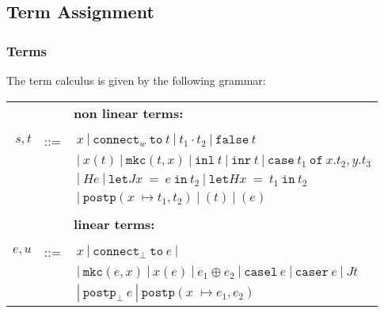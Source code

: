 \subsection{Term Assignment}
\label{sec:term_assignment}

\subsubsection{Terms}

The term calculus is given by the following grammar: 
\begin{center}

\begin{tabular}{rcl}
&&{\bf non linear terms:}\\
\\
$s, t$ & \quad ::=\quad &$\ x\ |\  \mathtt{connect}_w\ \mathtt{to}\  t\ |\  t_1\cdot t_2\ |\  \mathtt{false}\  t\ $\\
&& $\ |\ x(t)\ |\ \mathtt{mkc}(t, x)\ |\  \mathtt{inl}\ t\ |\ \mathtt{inr}\ t \ |\  \mathtt{case}\ t_1\ \mathtt{of}\ x.t_2 , y.t_3$\\
&& $\ |\ He\ |\  \mathtt{let}J x\ =\ e\ \mathtt{in}\ t_2\ |\ \mathtt{let} H x\ =\ t_1\ \mathtt{in}\ t_2$\\
&& $\ |\ \mathtt{postp} (x 􏰀\mapsto t_1, t_2)\ |\ (t) \ |\ (e) $ \\
\\
&&{\bf linear terms:}\\
\\
$e, u$ &\quad::=\quad & $ \ x\ |\  \mathtt{connect}_{\bot}\ \mathtt{to}\ e\ |$ \\
&& $\ |\  \mathtt{mkc}(e, x)\ |\  x(e)\ |\  e_1\oplus e_2\ |\ \mathtt{casel}\ e\ |\  \mathtt{caser}\ e\ |\ Jt$ \\
&& $\ |\  \mathtt{postp}_{\bot}\ e\ |\ \mathtt{postp} (x 􏰀\mapsto e_1, e_2)$\\
\end{tabular}
\end{center}
